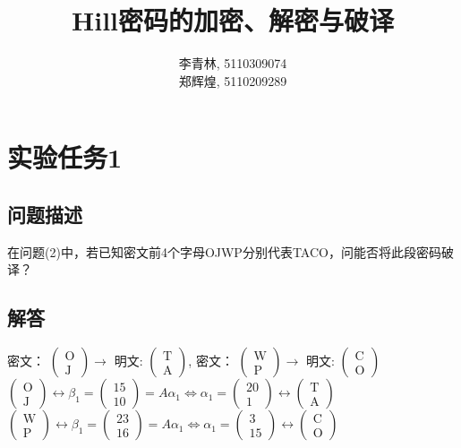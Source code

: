 \documentclass[12pt]{article}
\date{}
\title{Hill密码的加密、解密与破译}
\author{李青林, 5110309074\\郑辉煌, 5110209289\\}
\begin{document}
\maketitle
\section*{实验任务1}
\subsection*{问题描述}
在问题(2)中，若已知密文前4个字母OJWP分别代表TACO，问能否将此段密码破译？
\subsection*{解答}
密文：
$\begin{pmatrix}
\text{O}\\ \text{J}
\end{pmatrix}\longrightarrow$
明文:
$\begin{pmatrix}
\text{T}\\ \text{A}
\end{pmatrix}$,
密文：
$\begin{pmatrix}
\text{W}\\ \text{P}
\end{pmatrix}\longrightarrow$
明文:
$\begin{pmatrix}
\text{C}\\ \text{O}
\end{pmatrix}$\\

$\begin{pmatrix}
\text{O}\\ \text{J}
\end{pmatrix}\leftrightarrow\beta_1=
\begin{pmatrix}
15\\10
\end{pmatrix}=A\alpha_1\Leftrightarrow\alpha_1=
\begin{pmatrix}
20\\1
\end{pmatrix}\leftrightarrow
\begin{pmatrix}
\text{T}\\ \text{A}
\end{pmatrix}
$\\
$\begin{pmatrix}
\text{W}\\ \text{P}
\end{pmatrix}\leftrightarrow\beta_1=
\begin{pmatrix}
23\\16
\end{pmatrix}=A\alpha_1\Leftrightarrow\alpha_1=
\begin{pmatrix}
3\\15
\end{pmatrix}\leftrightarrow
\begin{pmatrix}
\text{C}\\ \text{O}
\end{pmatrix}$\\
\end{document}
